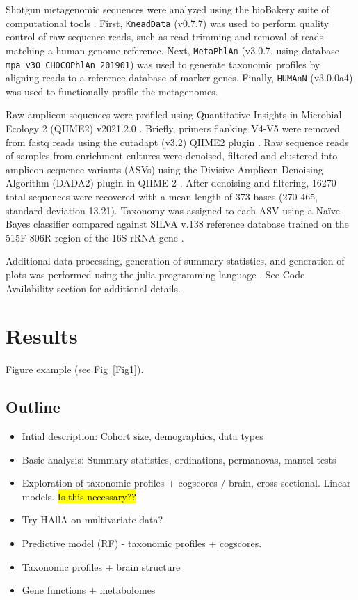 \documentclass[a4paper]{article}
\begin{document}
Shotgun metagenomic sequences were analyzed using the bioBakery suite of computational tools \cite{McIver2018-yc}.
First, \verb|KneadData| (v0.7.7) was used to perform quality control of raw sequence reads,
such as read trimming and removal of reads matching a human genome reference.
Next, \verb|MetaPhlAn| (v3.0.7, using database \verb|mpa_v30_CHOCOPhlAn_201901|) was used to generate taxonomic profiles
by aligning reads to a reference database of marker genes.
Finally, \verb|HUMAnN| (v3.0.0a4) was used to functionally profile the metagenomes.

Raw amplicon sequences were profiled using Quantitative Insights in Microbial Ecology 2 (QIIME2) v2021.2.0 \cite{Bolyen2019-qq}.
Briefly, primers flanking V4-V5 were removed from fastq reads using the cutadapt (v3.2) QIIME2 plugin \cite{Martin2011-zv}.
Raw sequence reads of samples from enrichment cultures were denoised, filtered and clustered into amplicon sequence variants (ASVs) using the Divisive Amplicon Denoising Algorithm (DADA2) plugin in QIIME 2 \cite{Callahan2016-ol}.
After denoising and filtering, 16270 total sequences were recovered with a mean length of 373 bases (270-465, standard deviation 13.21).
Taxonomy was assigned to each ASV using a Naïve-Bayes classifier compared against SILVA v.138 reference database \cite{Yilmaz2013-rj,Quast2013-hc}
trained on the 515F-806R region of the 16S rRNA gene \cite{Bokulich2018-dv}.

Additional data processing, generation of summary statistics, 
and generation of plots was performed using the julia programming language \cite{Bezanson2017-ud}.
See Code Availability section for additional details.

\section*{Results}
Figure example (see Fig~\ref{Fig1}). \\ 

\subsection*{Outline}

\begin{itemize}
  \item Intial description: Cohort size, demographics, data types
  \item Basic analysis: Summary statistics, ordinations, permanovas, mantel tests
  \item Exploration of taxonomic profiles + cogscores / brain, cross-sectional. Linear models. \hl{Is this necessary??}
  \item Try HAllA on multivariate data?
  \item Predictive model (RF) - taxonomic profiles + cogscores.
  \item Taxonomic profiles + brain structure
  \item Gene functions + metabolomes
\end{itemize}
\end{document}
